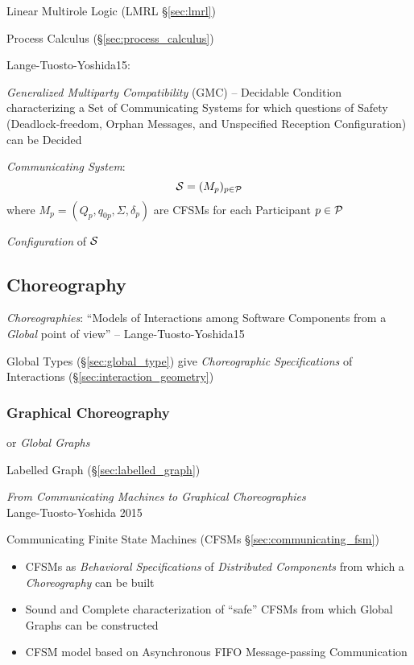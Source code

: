 Linear Multirole Logic (LMRL \S\ref{sec:lmrl})

\fist Process Calculus (\S\ref{sec:process_calculus})

Lange-Tuosto-Yoshida15:

\emph{Generalized Multiparty Compatibility} (GMC) -- Decidable
Condition characterizing a Set of Communicating Systems for which
questions of Safety (Deadlock-freedom, Orphan Messages, and
Unspecified Reception Configuration) can be Decided

\emph{Communicating System}:
\[
  \mathcal{S} = (M_p)_{p \in \mathcal{P}}
\]
where $M_p = (Q_p, q_{0p}, \Sigma, \delta_p)$ are CFSMs for each
Participant $p \in \mathcal{P}$

\emph{Configuration} of $\mathcal{S}$ %



\subsection{Choreography}\label{sec:choreography}

\emph{Choreographies}: ``Models of Interactions among Software
Components from a \emph{Global} point of view'' --
Lange-Tuosto-Yoshida15

\fist Global Types (\S\ref{sec:global_type}) give \emph{Choreographic
  Specifications} of Interactions (\S\ref{sec:interaction_geometry})



\subsubsection{Graphical Choreography}\label{sec:graphical_choreography}

or \emph{Global Graphs}

\fist Labelled Graph (\S\ref{sec:labelled_graph})

\begingroup

\newcommand{\party}{\mono}

\emph{From Communicating Machines to Graphical Choreographies} \\
Lange-Tuosto-Yoshida 2015

\fist Communicating Finite State Machines (CFSMs
\S\ref{sec:communicating_fsm})

\begin{itemize}
\item CFSMs as \emph{Behavioral Specifications} of \emph{Distributed
  Components} from which a \emph{Choreography} can be built
\item Sound and Complete characterization of ``safe'' CFSMs from which
  Global Graphs can be constructed
\item CFSM model based on Asynchronous FIFO Message-passing
  Communication
\end{itemize}

